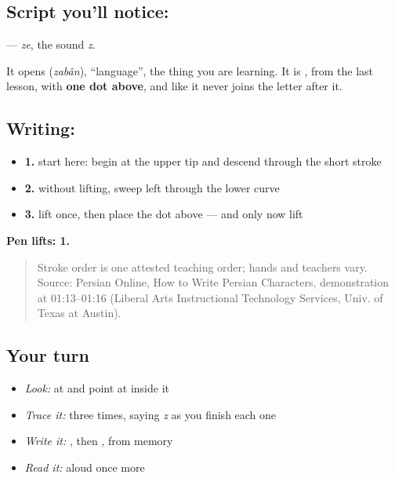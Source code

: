 \subsection*{Script you'll notice: }
\textbf{} — \emph{ze}, the sound \emph{z}.

It opens \textbf{} (\emph{zabân}), \textquotedblleft{}language\textquotedblright{}, the thing you are learning. It is \textbf{}, from the last lesson, with \textbf{one dot above}, and like \textbf{} it never joins the letter after it.

\subsection*{Writing: }

\begin{itemize}
\raggedright
  \item \textbf{1.} start here: begin at the upper tip and descend through the short stroke
  \item \textbf{2.} without lifting, sweep left through the lower curve
  \item \textbf{3.} lift once, then place the dot above — and only now lift
\end{itemize}

\textbf{Pen lifts: 1.}

\begin{quote}
Stroke order is one attested teaching order; hands and teachers vary. Source: Persian Online, How to Write Persian Characters,  demonstration at 01:13–01:16 (Liberal Arts Instructional Technology Services, Univ. of Texas at Austin).
\end{quote}

\subsection*{Your turn}
\begin{itemize}
\raggedright
  \item \emph{Look:} at \textbf{} and point at  inside it
  \item \emph{Trace it:}  three times, saying \emph{z} as you finish each one
  \item \emph{Write it:} , then , from memory
  \item \emph{Read it:} \textbf{} aloud once more
\end{itemize}

